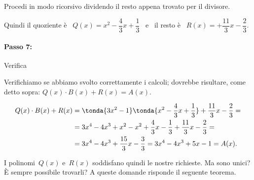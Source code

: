 \begin{esempio}{}{}
Procedi in modo ricorsivo dividendo il resto appena trovato per il 
divisore. 


Quindi il 
quoziente è~ \(Q(x)=x^2-\dfrac{4}{3}x+\dfrac{1}{3}\)~ e~ il
resto è~ \(R(x)=+{\dfrac{11}{3}}x-\dfrac{2}{3}\).
\end{esempio}

\paragraph{Passo 7: } Verifica

\begin{esempio}{}{}

Verifichiamo se abbiamo svolto correttamente i calcoli; dovrebbe 
risultare, come detto sopra: \(Q(x)\cdot B(x)+R(x) = A(x)\).

\vspace{-1.5em}
\begin{equation*}
\begin{split}
Q(x)\cdot B(x)+R(x) &= 
\tonda{3x^2-1}\tonda{x^2-\dfrac{4}{3}x+\dfrac{1}{3}}+
\dfrac{11}{3}x-\dfrac{2}{3} =\\ 
&=3x^4-4x^3+x^2-x^2+\dfrac{4}{3}x-
  \dfrac{1}{3}+\dfrac{11}{3}x-\dfrac{2}{3}=\\
&= 3x^4-4x^3+\dfrac{15}{3}x-\dfrac{3}{3}
= 3x^4-4x^3+5x-1 = A(x).
\end{split}
\end{equation*}
\end{esempio}

I polinomi~\(Q(x)\) e~\(R(x)\) soddisfano quindi le nostre richieste. 
Ma sono unici? È sempre possibile trovarli? 
A queste domande risponde il seguente teorema.

